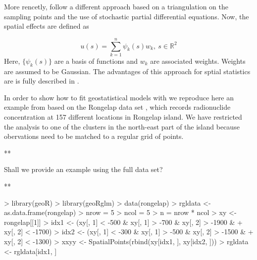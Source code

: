 \documentclass[article]{jss}
\begin{document}
More rencetly, \citet{Lindgren:2011} follow a different approach based on
a triangulation on the sampling points and the use of stochastic partial
differential equations. Now, the spatial effects are defined as

$$
u(s)=\sum_{k=1}^n \psi_k(s)w_k,\ s\in \mathbb{R}^2
$$
\noindent
Here, $\{\psi_k(s)\}$ are a basis of functions and $w_k$ are associated
weights. Weights are assumed to be Gaussian. The advantages of this approach
for sptial statistics are is fully described in \citet{Camelettietal:2011}.


In order to show how to fit geostatistical models with  we
reproduce here an example from \citet{GomezRubioetal:2013} based on the
Rongelap data set \citep{DiggleRibeiro:2007}, which records  radionuclide
concentration at 157 different locations in Rongelap island. We have restricted
the analysis to one of the clusters in the north-east part of the island
because obervations need to be matched to a regular grid of points.



**

Shall we provide an example using the full data set?

**

\begin{Schunk}
\begin{Sinput}
> library(geoR)
> library(geoRglm)
> data(rongelap)
> rgldata <- as.data.frame(rongelap)
> nrow = 5
> ncol = 5
> n = nrow * ncol
> xy <- rongelap[[1]]
> idx1 <- (xy[, 1] < -500 & xy[, 1] > -700 & xy[, 2] > -1900 & 
+     xy[, 2] < -1700)
> idx2 <- (xy[, 1] < -300 & xy[, 1] > -500 & xy[, 2] > -1500 & 
+     xy[, 2] < -1300)
> xxyy <- SpatialPoints(rbind(xy[idx1, ], xy[idx2, ]))
> rgldata <- rgldata[idx1, ]
\end{Sinput}
\end{Schunk}

\begin{Schunk}
\end{Schunk}
\end{document}
